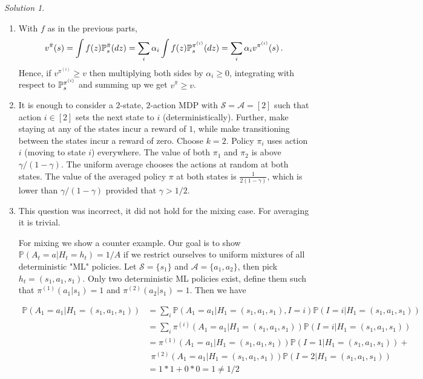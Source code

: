\documentclass{article}
\DeclareMathOperator*{\1}{\mathbbm{1}}
\newcommand{\0}{\mathbf{0}}
\theoremstyle{definition}
\theoremstyle{remark}
\newtheorem*{solution*}{Solution}
\theoremstyle{theorem}
\newcommand{\cS}{\mathcal{S}}
\newcommand{\cA}{\mathcal{A}}
\begin{document}
\begin{solution*}
\begin{enumerate}
\item With $f$ as in the previous parts,
\begin{align*}
v^{\bar \pi}(s) = \int f(z) \mathbb{P}_s^{\bar \pi}(dz)
= \sum_i \alpha_i \int f(z) \mathbb{P}_{s}^{\pi^{(i)}}(dz) = \sum_i \alpha_i v^{\pi^{(i)}}(s)\,.
\end{align*}
Hence, if $v^{\pi^{(i)}}\ge v$ then multiplying both sides by $\alpha_i\ge 0$,
integrating with respect to $\mathbb{P}_s^{\pi^{(i)}}$ and summing up we get
$v^{\bar \pi} \ge v$.

\item It is enough to consider a $2$-state, $2$-action MDP with $\cS = \cA = [2]$ such that action $i\in [2]$ sets the next state to $i$ (deterministically). Further, make staying at any of the states incur a reward of $1$, while make transitioning between the states incur a reward of zero.
Choose $k=2$. Policy $\pi_i$ uses action $i$ (moving to state $i$) everywhere.
The value of both $\pi_1$ and $\pi_2$ is above $\gamma/(1-\gamma)$. The uniform average chooses the actions at random at both states.
The value of the averaged policy $\pi$ at both states is $\frac{1}{2(1-\gamma)}$, which is lower than $\gamma/(1-\gamma)$ provided that $\gamma> 1/2$.

\item
This question was incorrect, it did not hold for the mixing case.
For averaging it is trivial.

For mixing we show a counter example.
Our goal is to show $\mathbb{P}(A_t = a |H_t = h_t) = 1/A$ if we restrict ourselves to uniform mixtures of all deterministic "ML" policies.
Let $\mathcal{S} = \{s_1\}$ and $\mathcal{A} = \{a_1, a_2\}$, then pick $h_t = (s_1, a_1, s_1)$.
Only two deterministic ML policies exist, define them such that $\pi^{(1)}(a_1|s_1) = 1$ and $\pi^{(2)}(a_2|s_1) = 1$. Then we have

\begin{align*}
\mathbb{P}(A_1 = a_1 |H_1 = (s_1, a_1, s_1))
&= \sum_i \mathbb{P}(A_1 = a_1 |H_1 = (s_1, a_1, s_1), I=i) \mathbb{P}(I=i| H_1 = (s_1, a_1, s_1)) \\
&= \sum_i \pi^{(i)} (A_1 = a_1 |H_1 = (s_1, a_1, s_1)) \mathbb{P}(I=i| H_1 = (s_1, a_1, s_1)) \\
&= \pi^{(1)} (A_1 = a_1 |H_1 = (s_1, a_1, s_1)) \mathbb{P}(I=1| H_1 = (s_1, a_1, s_1)) + \\
& \ \ \pi^{(2)} (A_1 = a_1 |H_1 = (s_1, a_1, s_1)) \mathbb{P}(I=2| H_1 = (s_1, a_1, s_1)) \\
&= 1 * 1 + 0 * 0 = 1 \neq 1/2
\end{align*}


\end{enumerate}
\end{solution*}
\end{document}
